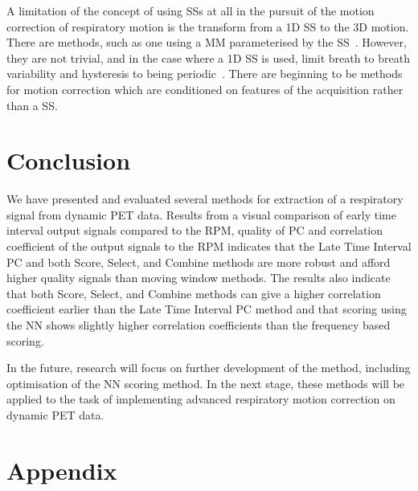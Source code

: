     A limitation of the concept of using \glspl{SS} at all in the pursuit of the motion correction of respiratory motion is the transform from a \gls{1D} \gls{SS} to the \gls{3D} motion. There are methods, such as one using a \gls{MM} parameterised by the \gls{SS}~\parencite{McClelland2017, McClelland2013}. However, they are not trivial, and in the case where a \gls{1D} \gls{SS} is used, limit breath to breath variability and hysteresis to being periodic~\parencite{Whitehead2021ComparisonMap}. There are beginning to be methods for motion correction which are conditioned on features of the acquisition rather than a \gls{SS}.
    
\section{Conclusion} \label{sec:conclusion}
    We have presented and evaluated several methods for extraction of a respiratory signal from dynamic \gls{PET} data. Results from a visual comparison of early time interval output signals compared to the \gls{RPM}, quality of \gls{PC} and correlation coefficient of the output signals to the \gls{RPM} indicates that the Late Time Interval \gls{PC} and both Score, Select, and Combine methods are more robust and afford higher quality signals than moving window methods. The results also indicate that both Score, Select, and Combine methods can give a higher correlation coefficient earlier than the Late Time Interval \gls{PC} method and that scoring using the \gls{NN} shows slightly higher correlation coefficients than the frequency based scoring.

    In the future, research will focus on further development of the method, including optimisation of the \gls{NN} scoring method. In the next stage, these methods will be applied to the task of implementing advanced respiratory motion correction on dynamic \gls{PET} data.

\section*{Appendix} \label{sec:appendix}
